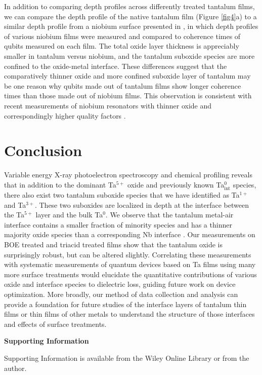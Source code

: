 \documentclass{WileyMSP-template}
\begin{document}
In addition to comparing depth profiles across differently treated tantalum films, we can compare the depth profile of the native tantalum film (Figure \ref{fig4}a) to a similar depth profile from a niobium surface presented in \cite{Anjali_Nb:2021}, in which depth profiles of various niobium films were measured and compared to coherence times of qubits measured on each film. The total oxide layer thickness is appreciably smaller in tantalum versus niobium, and the tantalum suboxide species are more confined to the oxide-metal interface. These differences suggest that the comparatively thinner oxide and more confined suboxide layer of tantalum may be one reason why qubits made out of tantalum films show longer coherence times than those made out of niobium films. This observation is consistent with recent measurements of niobium resonators with thinner oxide and correspondingly higher quality factors \cite{verjauw_investigation_2021}.

\section{Conclusion}

Variable energy X-ray photoelectron spectroscopy and chemical profiling reveals that in addition to the dominant Ta$^{5+}$ oxide and previously known Ta$^{0}_{\text{int}}$ species, there also exist two tantalum suboxide species that we have identified as Ta$^{1+}$ and Ta$^{3+}$. These two suboxides are localized in depth at the interface between the Ta$^{5+}$ layer and the bulk Ta$^{0}$. We observe that the tantalum metal-air interface contains a smaller fraction of minority species and has a thinner majority oxide species than a corresponding Nb interface \cite{Anjali_Nb:2021}. Our measurements on BOE treated and triacid treated films show that the tantalum oxide is surprisingly robust, but can be altered slightly. Correlating these measurements with systematic measurements of quantum devices based on Ta films using many more surface treatments would elucidate the quantitative contributions of various oxide and interface species to dielectric loss, guiding future work on device optimization. More broadly, our method of data collection and analysis can provide a foundation for future studies of the interface layers of tantalum thin films or thin films of other metals to understand the structure of those interfaces and effects of surface treatments.


\medskip
\textbf{Supporting Information} \par 
Supporting Information is available from the Wiley Online Library or from the author.
\end{document}
